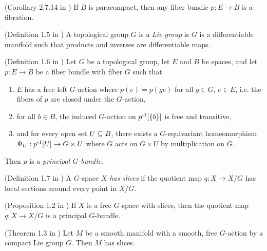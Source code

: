 \begin{lemma}\label{lem:paracompact-bundle-implies-fibration}
    (Corollary 2.7.14 in \cite{spanier1966algebraictopology})
    If $B$ is paracompact, then any fiber bundle $p : E \to B$ is a fibration.
\end{lemma}

\begin{definition}
    (Definition 1.5 in \cite{cohentopologyoffiberbundles})
    A topological group $G$ is a \emph{Lie group} is $G$ is a differentiable manifold such that products and inverses are differentiable maps.
\end{definition}

\begin{definition}
    (Definition 1.6 in \cite{cohentopologyoffiberbundles})
    Let $G$ be a topological group, let $E$ and $B$ be spaces, and let $p : E \to B$ be a fiber bundle with fiber $G$ such that
    \begin{enumerate}
        \item $E$ has a free left $G$-action where $p(e) = p(ge)$ for all $g \in G$, $e \in E$, i.e. the fibers of $p$ are closed under the $G$-action,
        \item for all $b \in B$, the induced $G$-action on $p^{\text{-}1}[\left\{ b \right\}]$ is free and transitive,
        \item and for every open set $U \subseteq B$, there exists a $G$-equivariant homeomorphism $\Psi_U : p^{\text{-}1}[U] \to G \times U$ where $G$ acts on $G \times U$ by multiplication on $G$.
    \end{enumerate}
    Then $p$ is a \emph{principal $G$-bundle}.
\end{definition}

\begin{definition}
    (Definition 1.7 in \cite{cohentopologyoffiberbundles})
    A $G$-space $X$ \emph{has slices} if the quotient map $q : X \to X/G$ has local sections around every point in $X/G$.
\end{definition}

\begin{proposition}\label{prop:slices-implies-bundle}
    (Proposition 1.2 in \cite{cohentopologyoffiberbundles})
    If $X$ is a free $G$-space with slices, then the quotient map $q : X \to X/G$ is a principal $G$-bundle.
\end{proposition}

\begin{theorem}\label{thm:free-cpt-implies-slices}
    (Theorem 1.3 in \cite{cohentopologyoffiberbundles})
    Let $M$ be a smooth manifold with a smooth, free $G$-action by a compact Lie group $G$.
    Then $M$ has slices.
\end{theorem}

